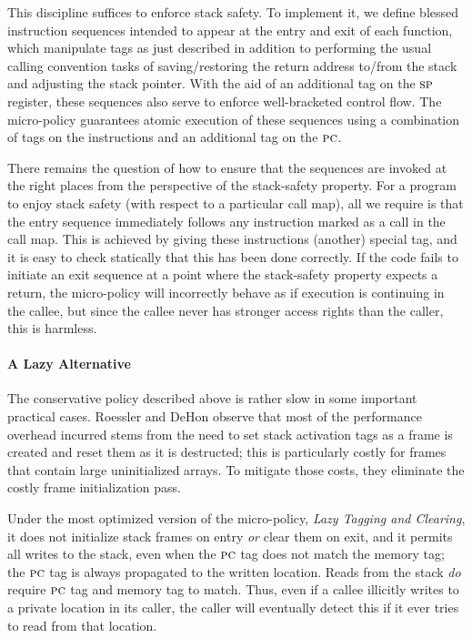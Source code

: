 \documentclass[10pt,conference]{ieeetran}%
\theoremstyle{definition}
\begin{document}
{\begin{itemize}
\end{itemize}

This discipline suffices to enforce stack safety.
To implement it,  we define blessed instruction sequences
intended to appear at the entry and exit of each function,
which manipulate tags as just described in addition to performing the
usual calling convention tasks of saving/restoring the return address to/from
the stack and adjusting the stack pointer. With the aid of an additional tag on
the $\textsc{sp}$ register, these sequences also serve to enforce
well-bracketed control flow.
The micro-policy guarantees atomic execution of these sequences
using a combination of tags on the instructions
and an additional tag on the $\textsc{pc}$.

There remains the question of how to ensure that the sequences are
invoked at the right places from the perspective of the stack-safety
property. For a program to enjoy stack safety
(with respect to a particular call map), all we require is that
the entry sequence immediately follows any instruction marked as a call
in the call map. This is achieved by giving these instructions (another) special tag,
and it is easy to check statically that this has been done correctly.
If the code fails to initiate an exit
sequence at a point where the stack-safety property expects a return,
the micro-policy will incorrectly behave as if execution
is continuing in the callee, but since the callee never has stronger access
rights than the caller, this is harmless.

\paragraph*{A Lazy Alternative}

The conservative policy described above is rather slow in
some important practical cases. Roessler and DeHon\cite{DBLP:conf/sp/RoesslerD18} observe
that most of the performance overhead incurred
stems from the need to set stack activation tags as a frame is created
and reset them as it is destructed;  this
is particularly costly for frames that contain large uninitialized arrays.
To mitigate those costs, they eliminate the costly frame initialization pass.

Under the most optimized version of the micro-policy, {\em Lazy Tagging and Clearing},
it does not initialize stack frames on entry \emph{or} clear them on exit,
and it permits all writes to the stack, even when the $\textsc{pc}$ tag
does not match the memory tag; the \(\textsc{pc}\) tag is always propagated
to the written location. Reads from the stack \emph{do} require $\textsc{pc}$
tag and memory tag to match. Thus, even if a callee illicitly writes to
a private location in its caller, the caller will eventually detect this
if it ever tries to read from that location.

}
\end{document}
